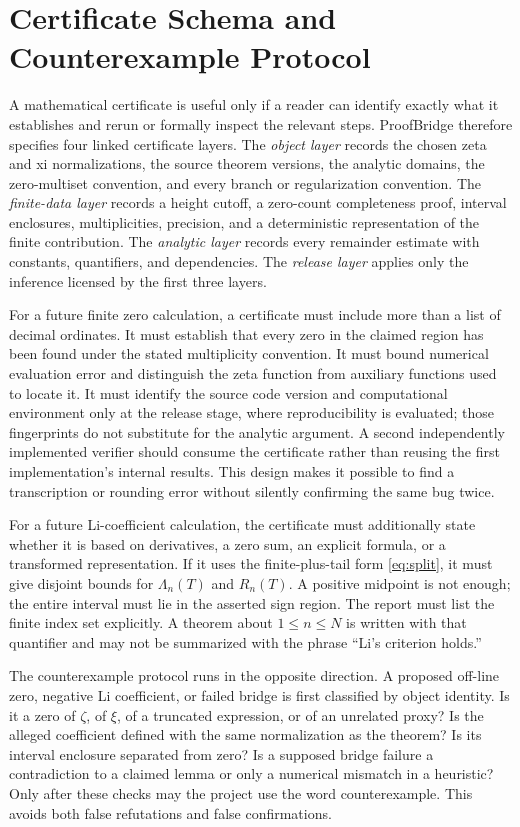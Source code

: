 \documentclass[conference]{../../../../Conference-LaTeX-template_10-17-19/IEEEtran}
\begin{document}
\section{Certificate Schema and Counterexample Protocol}
A mathematical certificate is useful only if a reader can identify exactly what it establishes and rerun or formally inspect the relevant steps. ProofBridge therefore specifies four linked certificate layers. The \emph{object layer} records the chosen zeta and xi normalizations, the source theorem versions, the analytic domains, the zero-multiset convention, and every branch or regularization convention. The \emph{finite-data layer} records a height cutoff, a zero-count completeness proof, interval enclosures, multiplicities, precision, and a deterministic representation of the finite contribution. The \emph{analytic layer} records every remainder estimate with constants, quantifiers, and dependencies. The \emph{release layer} applies only the inference licensed by the first three layers.

For a future finite zero calculation, a certificate must include more than a list of decimal ordinates. It must establish that every zero in the claimed region has been found under the stated multiplicity convention. It must bound numerical evaluation error and distinguish the zeta function from auxiliary functions used to locate it. It must identify the source code version and computational environment only at the release stage, where reproducibility is evaluated; those fingerprints do not substitute for the analytic argument. A second independently implemented verifier should consume the certificate rather than reusing the first implementation's internal results. This design makes it possible to find a transcription or rounding error without silently confirming the same bug twice.

For a future Li-coefficient calculation, the certificate must additionally state whether it is based on derivatives, a zero sum, an explicit formula, or a transformed representation. If it uses the finite-plus-tail form \eqref{eq:split}, it must give disjoint bounds for $\Lambda_n(T)$ and $R_n(T)$. A positive midpoint is not enough; the entire interval must lie in the asserted sign region. The report must list the finite index set explicitly. A theorem about $1\le n\le N$ is written with that quantifier and may not be summarized with the phrase ``Li's criterion holds.''

The counterexample protocol runs in the opposite direction. A proposed off-line zero, negative Li coefficient, or failed bridge is first classified by object identity. Is it a zero of $\zeta$, of $\xi$, of a truncated expression, or of an unrelated proxy? Is the alleged coefficient defined with the same normalization as the theorem? Is its interval enclosure separated from zero? Is a supposed bridge failure a contradiction to a claimed lemma or only a numerical mismatch in a heuristic? Only after these checks may the project use the word counterexample. This avoids both false refutations and false confirmations.
\end{document}
